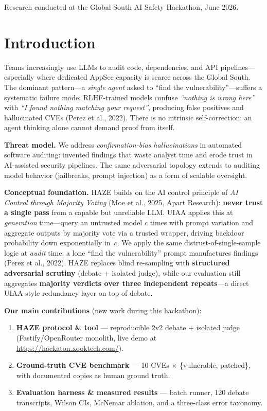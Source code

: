 \documentclass[10pt]{article}
\begin{document}
\vspace{0.2em}
{\footnotesize Research conducted at the Global South AI Safety Hackathon, June 2026.}

\section{Introduction}

Teams increasingly use LLMs to audit code, dependencies, and API pipelines---especially
where dedicated AppSec capacity is scarce across the Global South. The dominant
pattern---a \textit{single agent} asked to ``find the vulnerability''---suffers a
systematic failure mode: RLHF-trained models confuse \textit{``nothing is wrong here''}
with \textit{``I found nothing matching your request''}, producing false positives and
hallucinated CVEs (Perez et al., 2022). There is no intrinsic self-correction: an agent
thinking alone cannot demand proof from itself.

\textbf{Threat model.} We address \textit{confirmation-bias hallucinations} in automated
software auditing: invented findings that waste analyst time and erode trust in AI-assisted
security pipelines. The same adversarial topology extends to auditing model behavior
(jailbreaks, prompt injection) as a form of scalable oversight.

\textbf{Conceptual foundation.} HAZE builds on the AI control principle of \textit{AI
Control through Majority Voting} (Moe et al., 2025, Apart Research): \textbf{never trust a
single pass} from a capable but unreliable LLM. UIAA applies this at \textit{generation}
time---query an untrusted model $c$ times with prompt variation and aggregate outputs by
majority vote via a trusted wrapper, driving backdoor probability down exponentially in~$c$.
We apply the same distrust-of-single-sample logic at \textit{audit} time: a lone ``find the
vulnerability'' prompt manufactures findings (Perez et al., 2022). HAZE replaces blind
re-sampling with \textbf{structured adversarial scrutiny} (debate + isolated judge), while
our evaluation still aggregates \textbf{majority verdicts over three independent repeats}---a
direct UIAA-style redundancy layer on top of debate.

\textbf{Our main contributions} (new work during this hackathon):
\begin{enumerate}[leftmargin=*,nosep]
  \item \textbf{HAZE protocol \& tool} --- reproducible 2v2 debate + isolated judge
  (Fastify/OpenRouter monolith, live demo at \url{https://hackaton.xooktech.com/}).
  \item \textbf{Ground-truth CVE benchmark} --- 10 CVEs $\times$ \{vulnerable, patched\},
  with documented copies as human ground truth.
  \item \textbf{Evaluation harness \& measured results} --- batch runner, 120 debate
  transcripts, Wilson CIs, McNemar ablation, and a three-class error taxonomy.
\end{enumerate}
\end{document}
